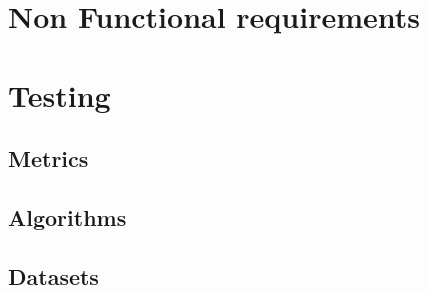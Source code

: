 \section{Non Functional requirements}


\section{Testing}

\subsection{Metrics}

\subsection{Algorithms}

\subsection{Datasets}